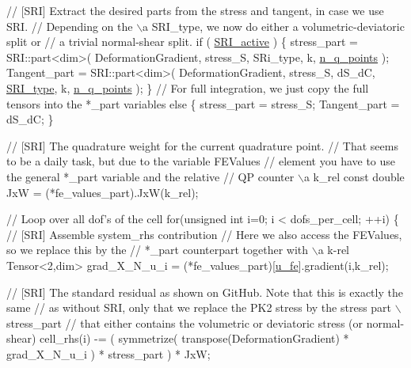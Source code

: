 \begin{DoxyCode}
            \textcolor{comment}{// [SRI] Extract the desired parts from the stress and tangent, in case we use SRI.}
            \textcolor{comment}{// Depending on the \(\backslash\)a SRI\_type, we now do either a volumetric-deviatoric split or}
            \textcolor{comment}{// a trivial normal-shear split.}
             \textcolor{keywordflow}{if} ( \hyperlink{assembly__routine__SRI_8cc_a535468030220abae9305a26e9d7f7401}{SRI\_active} )
             \{
                stress\_part = SRI::part<dim>( DeformationGradient, stress\_S, SRi\_type, k, 
      \hyperlink{assembly__routine__SRI_8cc_afd52b693751274175b93a58458201e6b}{n\_q\_points} );
                Tangent\_part = SRI::part<dim>( DeformationGradient, stress\_S, dS\_dC, 
      \hyperlink{assembly__routine__SRI_8cc_a163566963ded80f68a5bbc6d04ce0adf}{SRI\_type}, k, \hyperlink{assembly__routine__SRI_8cc_afd52b693751274175b93a58458201e6b}{n\_q\_points} );
             \}
             \textcolor{comment}{// For full integration, we just copy the full tensors into the *\_part variables}
             \textcolor{keywordflow}{else}
             \{
                stress\_part = stress\_S;
                Tangent\_part = dS\_dC;
             \}

            \textcolor{comment}{// [SRI] The quadrature weight for the current quadrature point.}
            \textcolor{comment}{// That seems to be a daily task, but due to the variable FEValues}
            \textcolor{comment}{// element you have to use the general *\_part variable and the relative}
            \textcolor{comment}{// QP counter \(\backslash\)a k\_rel}
             \textcolor{keyword}{const} \textcolor{keywordtype}{double} JxW = (*fe\_values\_part).JxW(k\_rel);

            \textcolor{comment}{// Loop over all dof's of the cell}
             \textcolor{keywordflow}{for}(\textcolor{keywordtype}{unsigned} \textcolor{keywordtype}{int} i=0; i < dofs\_per\_cell; ++i)
             \{
                \textcolor{comment}{// [SRI] Assemble system\_rhs contribution}
                \textcolor{comment}{// Here we also access the FEValues, so we replace this by the}
                \textcolor{comment}{// *\_part counterpart together with \(\backslash\)a k-rel}
                 Tensor<2,dim> grad\_X\_N\_u\_i = (*fe\_values\_part)[\hyperlink{assembly__routine__SRI_8cc_ae50a49c136e49c33fcd5a555a00009dd}{u\_fe}].gradient(i,k\_rel);

                \textcolor{comment}{// [SRI] The standard residual as shown on GitHub. Note that this is exactly the same}
                \textcolor{comment}{// as without SRI, only that we replace the PK2 stress by the stress part \(\backslash\)stress\_part}
                \textcolor{comment}{// that either contains the volumetric or deviatoric stress (or normal-shear)}
                cell\_rhs(i) -= ( symmetrize( transpose(DeformationGradient) * grad\_X\_N\_u\_i ) * stress\_part 
      ) * JxW;


\end{DoxyCode}
